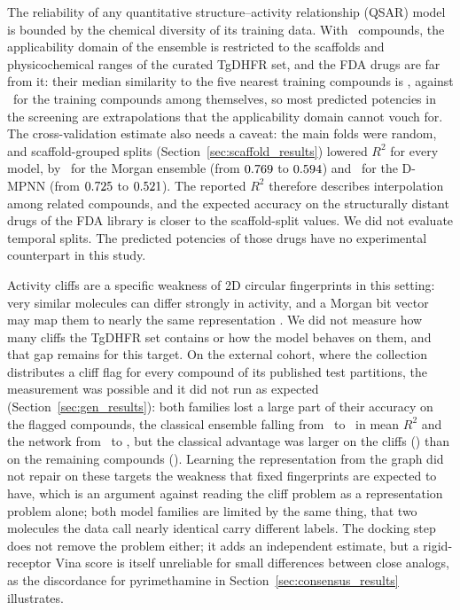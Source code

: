 The reliability of any quantitative structure--activity relationship (QSAR) model is bounded by the chemical diversity of its training data. With \NCompounds\ compounds, the applicability domain of the ensemble is restricted to the scaffolds and physicochemical ranges of the curated TgDHFR set, and the FDA drugs are far from it: their median similarity to the five nearest training compounds is \ScreenADFdaMedian, against \ScreenADTrainMedian\ for the training compounds among themselves, so most predicted potencies in the screening are extrapolations that the applicability domain cannot vouch for. The cross-validation estimate also needs a caveat: the main folds were random, and scaffold-grouped splits (Section~\ref{sec:scaffold_results}) lowered $R^2$ for every model, by \ScaffoldMorganDropRTwo\ for the Morgan ensemble (from $0.769$ to $0.594$) and \ScaffoldGnnDropRTwo\ for the D-MPNN (from $0.725$ to $0.521$). The reported $R^2$ therefore describes interpolation among related compounds, and the expected accuracy on the structurally distant drugs of the FDA library is closer to the scaffold-split values. We did not evaluate temporal splits. The predicted potencies of those drugs have no experimental counterpart in this study.

Activity cliffs are a specific weakness of 2D circular fingerprints in this setting: very similar molecules can differ strongly in activity, and a Morgan bit vector may map them to nearly the same representation \citep{vantilborg2022}. We did not measure how many cliffs the TgDHFR set contains or how the model behaves on them, and that gap remains for this target. On the external cohort, where the collection distributes a cliff flag for every compound of its published test partitions, the measurement was possible and it did not run as expected (Section~\ref{sec:gen_results}): both families lost a large part of their accuracy on the flagged compounds, the classical ensemble falling from \GenNonCliffClassicalRTwo\ to \GenCliffClassicalRTwo\ in mean $R^2$ and the network from \GenNonCliffGnnRTwo\ to \GenCliffGnnRTwo, but the classical advantage was larger on the cliffs (\GenCliffAdvMean) than on the remaining compounds (\GenNonCliffAdvMean). Learning the representation from the graph did not repair on these targets the weakness that fixed fingerprints are expected to have, which is an argument against reading the cliff problem as a representation problem alone; both model families are limited by the same thing, that two molecules the data call nearly identical carry different labels. The docking step does not remove the problem either; it adds an independent estimate, but a rigid-receptor Vina score is itself unreliable for small differences between close analogs, as the discordance for pyrimethamine in Section~\ref{sec:consensus_results} illustrates.

